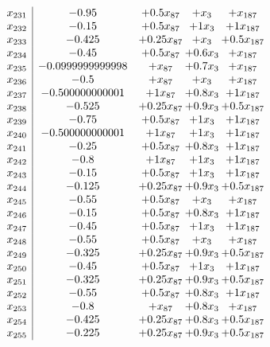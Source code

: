 \documentclass[11pt]{article}
\begin{document}
\[\begin{array}{c| c c@{\hskip 2pt} c@{\hskip 2pt} c@{\hskip 2pt} }
 x_{231}   &  -0.95 & + 0.5 x_{87} & +  x_{3} & +  x_{187}\\
 x_{232}   &  -0.15 & + 0.5 x_{87} & + 1 x_{3} & + 1 x_{187}\\
 x_{233}   &  -0.425 & + 0.25 x_{87} & +  x_{3} & + 0.5 x_{187}\\
 x_{234}   &  -0.45 & + 0.5 x_{87} & + 0.6 x_{3} & +  x_{187}\\
 x_{235}   &  -0.0999999999998 & +  x_{87} & + 0.7 x_{3} & +  x_{187}\\
 x_{236}   &  -0.5 & +  x_{87} & +  x_{3} & +  x_{187}\\
 x_{237}   &  -0.500000000001 & + 1 x_{87} & + 0.8 x_{3} & + 1 x_{187}\\
 x_{238}   &  -0.525 & + 0.25 x_{87} & + 0.9 x_{3} & + 0.5 x_{187}\\
 x_{239}   &  -0.75 & + 0.5 x_{87} & + 1 x_{3} & + 1 x_{187}\\
 x_{240}   &  -0.500000000001 & + 1 x_{87} & + 1 x_{3} & + 1 x_{187}\\
 x_{241}   &  -0.25 & + 0.5 x_{87} & + 0.8 x_{3} & + 1 x_{187}\\
 x_{242}   &  -0.8 & + 1 x_{87} & + 1 x_{3} & + 1 x_{187}\\
 x_{243}   &  -0.15 & + 0.5 x_{87} & + 1 x_{3} & + 1 x_{187}\\
 x_{244}   &  -0.125 & + 0.25 x_{87} & + 0.9 x_{3} & + 0.5 x_{187}\\
 x_{245}   &  -0.55 & + 0.5 x_{87} & +  x_{3} & +  x_{187}\\
 x_{246}   &  -0.15 & + 0.5 x_{87} & + 0.8 x_{3} & + 1 x_{187}\\
 x_{247}   &  -0.45 & + 0.5 x_{87} & + 1 x_{3} & + 1 x_{187}\\
 x_{248}   &  -0.55 & + 0.5 x_{87} & +  x_{3} & +  x_{187}\\
 x_{249}   &  -0.325 & + 0.25 x_{87} & + 0.9 x_{3} & + 0.5 x_{187}\\
 x_{250}   &  -0.45 & + 0.5 x_{87} & + 1 x_{3} & + 1 x_{187}\\
 x_{251}   &  -0.325 & + 0.25 x_{87} & + 0.9 x_{3} & + 0.5 x_{187}\\
 x_{252}   &  -0.55 & + 0.5 x_{87} & + 0.8 x_{3} & + 1 x_{187}\\
 x_{253}   &  -0.8 & +  x_{87} & + 0.8 x_{3} & +  x_{187}\\
 x_{254}   &  -0.425 & + 0.25 x_{87} & + 0.8 x_{3} & + 0.5 x_{187}\\
 x_{255}   &  -0.225 & + 0.25 x_{87} & + 0.9 x_{3} & + 0.5 x_{187}\\

\end{array}\]
\end{document}
